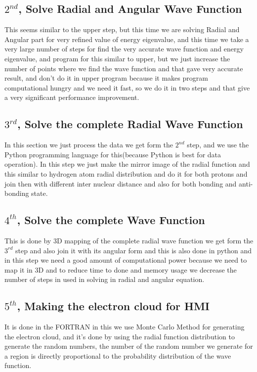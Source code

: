 \documentclass[12pt]{report}
\begin{document}
		\subsection{$2^{nd}$, Solve Radial and Angular Wave Function}
			\normalsize This seems similar to the upper step, but this time we are solving Radial and Angular part for very refined value of energy eigenvalue, and this time we take a very large number of steps for find the very accurate wave function and energy eigenvalue, and program for this similar to upper, but we just increase the number of points where we find the wave function and that gave very accurate result, and don't do it in upper program because it makes program computational hungry and we need it fast, so we do it in two steps and that give a very significant performance improvement.
		\subsection{$3^{rd}$, Solve the complete Radial Wave Function}
			\normalsize In this section we just process the data we get form the $2^{nd}$ step, and we use the Python programming language for this(because Python is best for data operation). In this step we just make the mirror image of the radial function and this similar to hydrogen atom radial distribution and do it for both protons and join then with different inter nuclear distance and also for both bonding and anti-bonding state.
		\subsection{$4^{th}$, Solve the complete Wave Function}
			\normalsize This is done by 3D mapping of the complete radial wave function we get form the $3^{rd}$ step and also join it with its angular form and this is also done in python and in this step we need a good amount of computational power because we need to map it in 3D and to reduce time to done and memory usage we decrease the number of steps in used in solving in radial and angular equation.
		\subsection{$5^{th}$, Making the electron cloud for HMI}
			\normalsize It is done in the FORTRAN in this we use Monte Carlo Method for generating the electron cloud, and it's done by using the radial function distribution to generate the random numbers, the number of the random number we generate for a region is  directly proportional to the probability distribution of the wave function.\\
\end{document}
